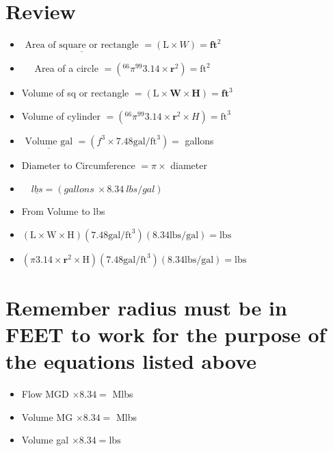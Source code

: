 \documentclass[10pt]{article}
\begin{document}
\section{Review}
\begin{itemize}
  \item $\underline{\text { Area of square or rectangle }}=(\mathrm{L} \times W)=\mathbf{f t}^{2}$

  \item $\quad$ Area of a circle $=\left({ }^{66} \pi^{99} 3.14 \times \mathbf{r}^{2}\right)=\mathrm{ft}^{2}$

  \item Volume of sq or rectangle $=(\mathrm{L} \times \mathbf{W} \times \mathbf{H})=\mathbf{f t}^{3}$

  \item Volume of cylinder $=\left({ }^{66} \pi^{99} 3.14 \times \mathbf{r}^{2} \times H\right)=\mathrm{ft}^{3}$

  \item $\underline{\text { Volume gal }}=\left(f^{3} \times 7.48 \mathrm{gal} / \mathrm{ft}^{3}\right)=$ gallons

  \item Diameter to Circumference $=\pi \times$ diameter

  \item $\quad \underline{l b s}=(g a l l o n s ~ \times 8.34 ~ l b s / g a l)$

  \item From Volume to lbs

  \item $(\mathrm{L} \times \mathrm{W} \times \mathrm{H})\left(7.48 \mathrm{gal} / \mathrm{ft}^{3}\right)(8.34 \mathrm{lbs} / \mathrm{gal})=\mathrm{lbs}$

  \item $\left(\pi 3.14 \times \mathbf{r}^{2} \times \mathrm{H}\right)\left(7.48 \mathrm{gal} / \mathrm{ft}^{3}\right)(8.34 \mathrm{lbs} / \mathrm{gal})=\mathrm{lbs}$

\end{itemize}
\section{Remember radius must be in FEET to work for the purpose of the equations listed above}
\begin{itemize}
  \item Flow MGD $\times 8.34=$ Mlbs

  \item Volume MG $\times 8.34=$ Mlbs

  \item Volume gal $\times 8.34=\mathrm{lbs}$

\end{itemize}
\end{document}
